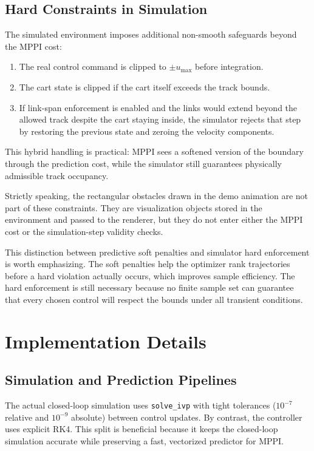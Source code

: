 \documentclass[conference]{IEEEtran}
\begin{document}
\subsection{Hard Constraints in Simulation}
The simulated environment imposes additional non-smooth safeguards beyond the MPPI cost:
\begin{enumerate}
\item The real control command is clipped to $\pm u_{\max}$ before integration.
\item The cart state is clipped if the cart itself exceeds the track bounds.
\item If link-span enforcement is enabled and the links would extend beyond the allowed track despite the cart staying inside, the simulator rejects that step by restoring the previous state and zeroing the velocity components.
\end{enumerate}
This hybrid handling is practical: MPPI sees a softened version of the boundary through the prediction cost, while the simulator still guarantees physically admissible track occupancy.

Strictly speaking, the rectangular obstacles drawn in the demo animation are not part of these constraints. They are visualization objects stored in the environment and passed to the renderer, but they do not enter either the MPPI cost or the simulation-step validity checks.

This distinction between predictive soft penalties and simulator hard enforcement is worth emphasizing. The soft penalties help the optimizer rank trajectories before a hard violation actually occurs, which improves sample efficiency. The hard enforcement is still necessary because no finite sample set can guarantee that every chosen control will respect the bounds under all transient conditions.

\section{Implementation Details}
\subsection{Simulation and Prediction Pipelines}
The actual closed-loop simulation uses \texttt{solve\_ivp} with tight tolerances ($10^{-7}$ relative and $10^{-9}$ absolute) between control updates. By contrast, the controller uses explicit RK4. This split is beneficial because it keeps the closed-loop simulation accurate while preserving a fast, vectorized predictor for MPPI.
\end{document}
